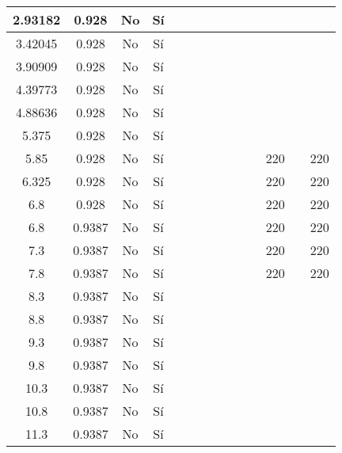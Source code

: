 \begin{table}[H]
{\begin{tabular}{|c|c|c|c|c|c|c|c|c|c|c|c|c|c|}
\hline
2.93182 & 0.928 & No  & Sí  &     &     &     &     &     &     &     &     &     &  \bigstrut\\
\hline
3.42045 & 0.928 & No  & Sí  &     &     &     &     &     &     &     &     &     &  \bigstrut\\
\hline
3.90909 & 0.928 & No  & Sí  &     &     &     &     &     &     &     &     &     &  \bigstrut\\
\hline
4.39773 & 0.928 & No  & Sí  &     &     &     &     &     &     &     &     &     &  \bigstrut\\
\hline
4.88636 & 0.928 & No  & Sí  &     &     &     &     &     &     &     &     &     &  \bigstrut\\
\hline
5.375 & 0.928 & No  & Sí  &     &     &     &     &     &     &     &     &     &  \bigstrut\\
\hline
5.85 & 0.928 & No  & Sí  &     &     &     &     &     &     &     & 220 &     & 220 \bigstrut\\
\hline
6.325 & 0.928 & No  & Sí  &     &     &     &     &     &     &     & 220 &     & 220 \bigstrut\\
\hline
6.8 & 0.928 & No  & Sí  &     &     &     &     &     &     &     & 220 &     & 220 \bigstrut\\
\hline
6.8 & 0.9387 & No  & Sí  &     &     &     &     &     &     &     & 220 &     & 220 \bigstrut\\
\hline
7.3 & 0.9387 & No  & Sí  &     &     &     &     &     &     &     & 220 &     & 220 \bigstrut\\
\hline
7.8 & 0.9387 & No  & Sí  &     &     &     &     &     &     &     & 220 &     & 220 \bigstrut\\
\hline
8.3 & 0.9387 & No  & Sí  &     &     &     &     &     &     &     &     &     &  \bigstrut\\
\hline
8.8 & 0.9387 & No  & Sí  &     &     &     &     &     &     &     &     &     &  \bigstrut\\
\hline
9.3 & 0.9387 & No  & Sí  &     &     &     &     &     &     &     &     &     &  \bigstrut\\
\hline
9.8 & 0.9387 & No  & Sí  &     &     &     &     &     &     &     &     &     &  \bigstrut\\
\hline
10.3 & 0.9387 & No  & Sí  &     &     &     &     &     &     &     &     &     &  \bigstrut\\
\hline
10.8 & 0.9387 & No  & Sí  &     &     &     &     &     &     &     &     &     &  \bigstrut\\
\hline
11.3 & 0.9387 & No  & Sí  &     &     &     &     &     &     &     &     &     &  \bigstrut\\

\end{tabular}}
\end{table}
